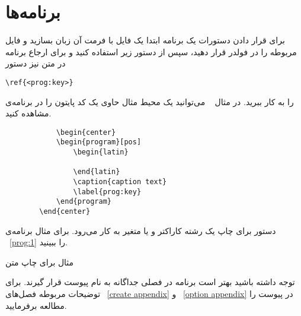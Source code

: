 \section{برنامه‌ها} 
برای قرار دادن دستورات یک برنامه ابتدا یک فایل با فرمت آن زبان بسازید و فایل مربوطه را در فولدر 
قرار دهید، سپس از دستور زیر استفاده کنید و برای ارجاع برنامه در متن نیز دستور 

\begin{latin}
	\noindent
	\verb|\ref{<prog:key>}|
\end{latin}
را به کار ببرید.  در مثال 
~
می‌توانید یک محیط مثال حاوی یک کد پایتون را در برنامه‌ی مشاهده کنید. 
\begin{latin}
	\begin{verbatim}
			\begin{center}
			\begin{program}[pos]
				\begin{latin}
					
				\end{latin}
				\caption{caption text}
				\label{prog:key}
			\end{program}
		\end{center}
	\end{verbatim}
\end{latin}

\begin{example} \label{exam: print}
	دستور 
	برای چاپ یک رشته کاراکتر و یا متغیر به کار می‌رود. برای مثال برنامه‌ی 
	~\ref{prog:1} 
	را ببینید. 
	\begin{center}
	\begin{program}[h]
		\begin{latin}
			
		\end{latin}
		\caption{مثال برای چاپ متن 
		}
		\label{prog:1}
	\end{program}
\end{center}
\end{example}
توجه داشته باشید بهتر است برنامه در فصلی جداگانه به نام 
پیوست قرار گیرند. برای توضیحات مربوطه فصل‌های 
~\ref{create appendix} 
و
~\ref{option appendix}
در پیوست را مطالعه برفرمایید. 

 